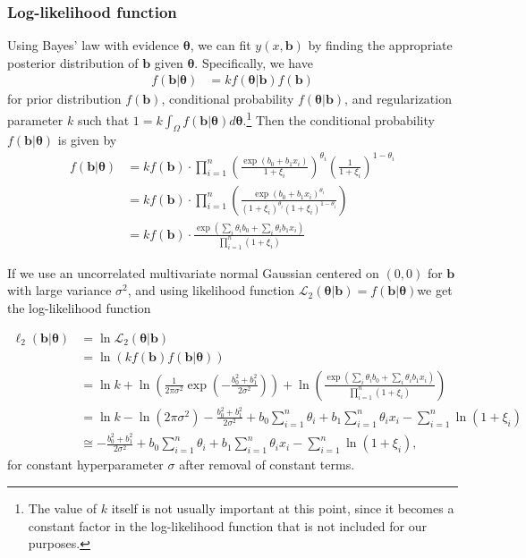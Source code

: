 \documentclass[11pt, letterpaper]{article}
\newcommand{\mc}[1]{\mathcal{#1}}
\begin{document}
\subsubsection{Log-likelihood function}\label{sect:l2-ll}
Using Bayes' law with evidence $\bm \theta$, we can fit $y(x, \bm b)$ by finding the appropriate posterior distribution of $\bm b$ given $\bm \theta$. Specifically, we have 
\begin{align*}
f(\bm b | \bm \theta) &= k f(\bm \theta | \bm b) f(\bm b)
\end{align*}
for prior distribution $f(\bm b)$, conditional probability $f(\bm \theta | \bm b)$, and regularization parameter $k$ such that $1 = k\int_\Omega f( \bm b | \bm \theta) d \bm \theta$.\footnote{The value of $k$ itself is not usually important at this point, since it becomes a constant factor in the log-likelihood function that is not included for our purposes.} Then the conditional probability $f(\bm b | \bm \theta)$ is given by
\begin{align*}
f(\bm b | \bm \theta) &= k f(\bm b) \cdot \prod_{i=1}^n \left( \frac{\exp(b_0+b_1x_i)}{1+\xi_i}\right)^{\theta_i}\left( \frac{1}{1+\xi_i}\right)^{1-\theta_i}\\
&= kf(\bm b) \cdot \prod_{i=1}^n \left( \frac{\exp(b_0+b_1x_i)^{\theta_i}}{\left(1+\xi_i\right)^{\theta_i}\left(1+\xi_i\right)^{1-\theta_i}}\right)\\
&=k f(\bm b) \cdot  \frac{\exp\left(\sum_i \theta_i b_0+\sum_i \theta_i b_1x_i\right)}{\prod_{i=1}^n \left( 1+\xi_i\right)}
\end{align*}

If we use an uncorrelated multivariate normal Gaussian centered on $(0,0)$ for $\bm b$ with large variance $\sigma^2$, and using likelihood function $\mc L_2(\bm \theta | \bm b) = f(\bm b | \bm \theta) $we get the log-likelihood function

\begin{align*}
\ell_2(\bm b | \bm \theta) &= \ln \mc L_2(\bm \theta | \bm b) \\
&= \ln( kf(\bm b)f(\bm b | \bm \theta)) \\
&=\ln k + \ln \left(\frac{1}{2\pi \sigma^2} \exp \left(-\frac{b_0^2 + b_1^2}{2\sigma^2} \right) \right) + \ln \left( \frac{\exp\left(\sum_i \theta_i b_0+\sum_i \theta_i b_1x_i\right)}{\prod_{i=1}^n \left( 1+\xi_i\right)} \right) \\
&= \ln k - \ln(2 \pi \sigma^2) - \frac{b_0^2 + b_1^2}{2\sigma^2} + b_0\sum_{i=1}^n \theta_i + b_1\sum_{i=1}^n \theta_ix_i - \sum_{i=1}^n \ln \left(1+\xi_i \right) \\
& \cong - \frac{b_0^2 + b_1^2}{2\sigma^2} + b_0\sum_{i=1}^n \theta_i + b_1\sum_{i=1}^n \theta_ix_i - \sum_{i=1}^n \ln \left(1+\xi_i \right),
\end{align*}
for constant hyperparameter $\sigma$ after removal of constant terms.
\end{document}
